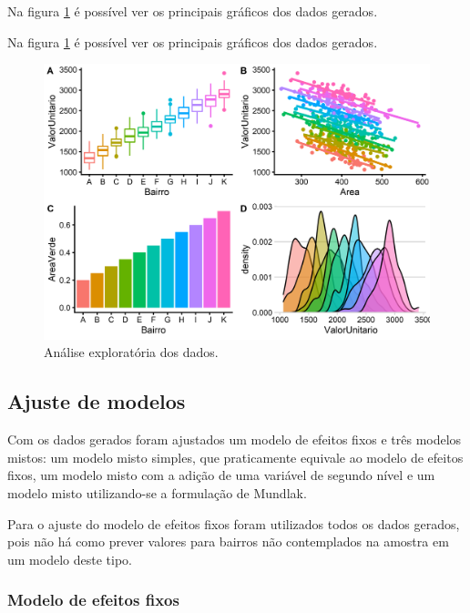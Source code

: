 \documentclass[
  a4paper, 11pt]{article}
\begin{document}
Na figura \ref{fig:exploratoria} é possível ver os principais gráficos
dos dados gerados.

Na figura \ref{fig:exploratoria} é possível ver os principais gráficos
dos dados gerados.

\begin{figure}[H]

{\centering \includegraphics[width=1\linewidth]{images/exploratoria-1} 

}

\caption{Análise exploratória dos dados.}\label{fig:exploratoria}
\end{figure}

\hypertarget{ajuste-de-modelos}{%
\subsection{Ajuste de modelos}\label{ajuste-de-modelos}}

Com os dados gerados foram ajustados um modelo de efeitos fixos e três
modelos mistos: um modelo misto simples, que praticamente equivale ao
modelo de efeitos fixos, um modelo misto com a adição de uma variável de
segundo nível e um modelo misto utilizando-se a formulação de Mundlak.

Para o ajuste do modelo de efeitos fixos foram utilizados todos os dados
gerados, pois não há como prever valores para bairros não contemplados
na amostra em um modelo deste tipo.

\hypertarget{modelo-de-efeitos-fixos}{%
\subsubsection{Modelo de efeitos fixos}\label{modelo-de-efeitos-fixos}}
\end{document}
